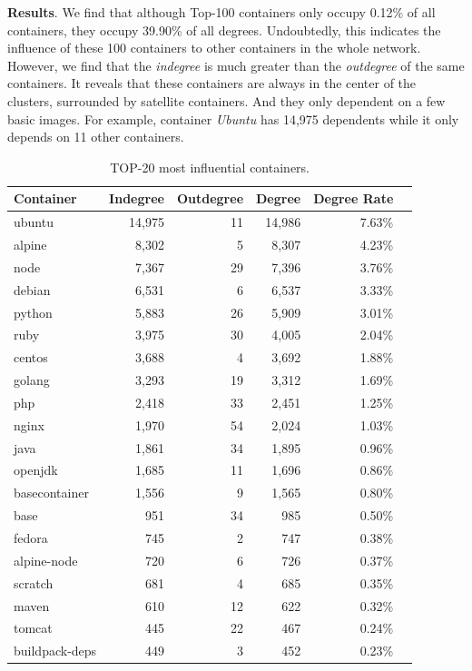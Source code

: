 \documentclass[sigconf]{acmart}
\begin{document}
\noindent\textbf{Results}. 
We find that although Top-100 containers only occupy 
0.12\% of all containers, they occupy 39.90\% of all degrees. 
Undoubtedly, this indicates the influence of these 100 containers to other containers in the whole network. 
However, we find that 
the \emph{indegree} is much greater than the \emph{outdegree} of the same containers. It reveals that these containers are always in the center of the clusters, surrounded by satellite containers. And they only dependent on a few basic images.   %
For example, container \emph{Ubuntu} has 14,975 dependents while it only depends on 11 other containers. 

\begin{table}[htbp]
  \centering
  \small
  \caption{TOP-20 most influential containers.}\vspace{-0.3cm}
    \begin{tabular}{lrrrrr}
\toprule
    Container    & \multicolumn{1}{l}{Indegree} & \multicolumn{1}{l}{Outdegree} & \multicolumn{1}{l}{Degree} & \multicolumn{1}{l}{Degree Rate} \\
\midrule
    ubuntu  & 14,975 & 11    & 14,986 & 7.63\% \\
    alpine  & 8,302 & 5     & 8,307 & 4.23\% \\
    node   & 7,367 & 29    & 7,396 & 3.76\% \\
    debian  & 6,531 & 6     & 6,537 & 3.33\% \\
    python  & 5,883 & 26    & 5,909 & 3.01\% \\
    ruby   & 3,975 & 30    & 4,005 & 2.04\% \\
    centos  & 3,688 & 4     & 3,692 & 1.88\% \\
    golang  & 3,293  & 19    & 3,312  & 1.69\% \\
    php    & 2,418 & 33    & 2,451 & 1.25\% \\
    nginx  & 1,970  & 54    & 2,024  & 1.03\% \\
    java   & 1,861  & 34    & 1,895  & 0.96\% \\
    openjdk  & 1,685  & 11    & 1,696  & 0.86\% \\
    basecontainer  & 1,556 & 9     & 1,565 & 0.80\% \\
    base   & 951   & 34    & 985   & 0.50\% \\
    fedora  & 745   & 2     & 747   & 0.38\% \\
    alpine-node & 720   & 6     & 726   & 0.37\% \\
    scratch  & 681   & 4     & 685   & 0.35\% \\
    maven  & 610   & 12    & 622   & 0.32\% \\
    tomcat  & 445   & 22    & 467   & 0.24\% \\
    buildpack-deps  & 449   & 3     & 452   & 0.23\% \\
\bottomrule
    \end{tabular}%
  \label{tab:top20}%
\end{table}%
\end{document}
